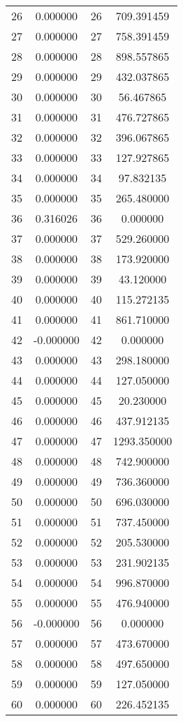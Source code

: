 \documentclass[12pt]{article}
\begin{document}
\begin{longtable}{@{}cccc@{}}
26 & 0.000000 & 26 & 709.391459 \\
27 & 0.000000 & 27 & 758.391459 \\
28 & 0.000000 & 28 & 898.557865 \\
29 & 0.000000 & 29 & 432.037865 \\
30 & 0.000000 & 30 & 56.467865 \\
31 & 0.000000 & 31 & 476.727865 \\
32 & 0.000000 & 32 & 396.067865 \\
33 & 0.000000 & 33 & 127.927865 \\
34 & 0.000000 & 34 & 97.832135 \\
35 & 0.000000 & 35 & 265.480000 \\
36 & 0.316026 & 36 & 0.000000 \\
37 & 0.000000 & 37 & 529.260000 \\
38 & 0.000000 & 38 & 173.920000 \\
39 & 0.000000 & 39 & 43.120000 \\
40 & 0.000000 & 40 & 115.272135 \\
41 & 0.000000 & 41 & 861.710000 \\
42 & -0.000000 & 42 & 0.000000 \\
43 & 0.000000 & 43 & 298.180000 \\
44 & 0.000000 & 44 & 127.050000 \\
45 & 0.000000 & 45 & 20.230000 \\
46 & 0.000000 & 46 & 437.912135 \\
47 & 0.000000 & 47 & 1293.350000 \\
48 & 0.000000 & 48 & 742.900000 \\
49 & 0.000000 & 49 & 736.360000 \\
50 & 0.000000 & 50 & 696.030000 \\
51 & 0.000000 & 51 & 737.450000 \\
52 & 0.000000 & 52 & 205.530000 \\
53 & 0.000000 & 53 & 231.902135 \\
54 & 0.000000 & 54 & 996.870000 \\
55 & 0.000000 & 55 & 476.940000 \\
56 & -0.000000 & 56 & 0.000000 \\
57 & 0.000000 & 57 & 473.670000 \\
58 & 0.000000 & 58 & 497.650000 \\
59 & 0.000000 & 59 & 127.050000 \\
60 & 0.000000 & 60 & 226.452135 \\

\end{longtable}
\end{document}

